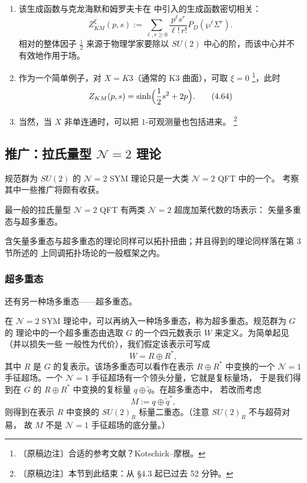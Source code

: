 \begin{enumerate}[label=\arabic*., leftmargin=2.2em]
  \item 该生成函数与克龙海默和姆罗夫卡在 \cite{ref21} 中引入的生成函数密切相关：
    \begin{equation}
      Z^{\xi}_{KM}(p,s):=\sum_{\ell,r\ge0}\frac{p^{\ell}s^{r}}{\ell!\,r!}
      P_{D}(\wp^{\ell}\Sigma^{r}).
      \tag{4.63}
    \end{equation}
    相对的整体因子 $\frac{1}{2}$ 来源于物理学家要除以 $SU(2)$ 中心的阶，而该中心并不
    有效地作用于场。

  \item 作为一个简单例子，对 $X=K3$（通常的 K3 曲面），可取 $\xi=0$
    \footnote{〔原稿边注〕合适的参考文献？Kotschick--摩根。}，此时
    \begin{equation}
      Z_{KM}(p,s)=\sinh\Bigl(\frac{1}{2}s^{2}+2p\Bigr).
      \tag{4.64}
    \end{equation}

  \item 当然，当 $X$ 非单连通时，可以把 $1$-可观测量也包括进来。
    \footnote{〔原稿边注〕本节到此结束：从 §4.3 起已过去 52 分钟。}
\end{enumerate}

\subsection{推广：拉氏量型 $\mathcal{N}=2$ 理论}
\label{sec:4-7}

规范群为 $SU(2)$ 的 $\mathcal{N}=2$ SYM 理论只是一大类 $\mathcal{N}=2$ QFT 中的一个。
考察其中一些推广将颇有收获。

最一般的拉氏量型 $\mathcal{N}=2$ QFT 有两类 $\mathcal{N}=2$ 超庞加莱代数的场表示：
矢量多重态与超多重态。

含矢量多重态与超多重态的理论同样可以拓扑扭曲；并且得到的理论同样落在第 3 节所述的
上同调拓扑场论的一般框架之内。

\subsubsection{超多重态}
\label{sec:4-7-1}

还有另一种场多重态——超多重态。

在 $\mathcal{N}=2$ SYM 理论中，可以再纳入一种场多重态，称为超多重态。规范群为 $G$ 的
理论中的一个超多重态由选取 $G$ 的一个四元数表示 $W$ 来定义。为简单起见（并以损失一些
一般性为代价），我们假定该表示可写成
\begin{equation}
  W=R\oplus R^{*},
  \tag{4.65}
\end{equation}
其中 $R$ 是 $G$ 的复表示。该场多重态可以看作在表示 $R\oplus R^{*}$ 中变换的一个
$\mathcal{N}=1$ 手征超场。一个 $\mathcal{N}=1$ 手征超场有一个领头分量，它就是复标量场，
于是我们得到在 $G$ 的 $R\oplus R^{*}$ 中变换的复标量 $q\oplus\tilde q$。在超多重态中，
若改而考虑
\begin{equation}
  M:=q\oplus\tilde q^{*},
  \tag{4.66}
\end{equation}
则得到在表示 $R$ 中变换的 $SU(2)_{R}$ 标量二重态。（注意 $SU(2)_{R}$ 不与超荷对易，
故 $M$ 不是 $\mathcal{N}=1$ 手征超场的底分量。）


